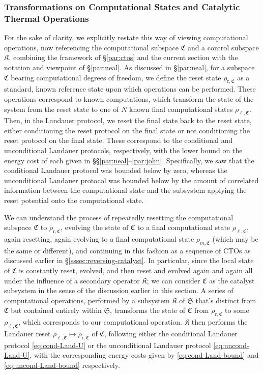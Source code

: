 \documentclass[preprints,article,accept,moreauthors,pdftex]{Definitions/mdpi}
\begin{document}
\begin{paracol}{2}
\subsubsection{Transformations on Computational States and Catalytic Thermal Operations}
\label{sssec:CTOs-catalysts-computers}
For the sake of clarity, we explicitly restate this way of viewing computational operations, now referencing the computational subspace $\mathfrak{C}$ and a control subspace $\mathfrak{K}$, combining the framework of \S\ref{par:ctos} and the current section with the notation and viewpoint of \S\ref{par:neal}. As discussed in \S\ref{par:neal}, for a subspace $\mathfrak{C}$ bearing computational degrees of freedom, we define the reset state $\rho_{\mathrm{r},\mathfrak{C}}$ as a standard, known reference state upon which operations can be performed. These operations correspond to known computations, which transform the state of the system from the reset state to one of $N$ known final computational states $\rho_{\ell,\mathfrak{C}}$. Then, in the Landauer protocol, we reset the final state back to the reset state, either conditioning the reset protocol on the final state or not conditioning the reset protocol on the final state. These correspond to the conditional and unconditional Landauer protocols, respectively, with the lower bound on the energy cost of each given in \S\S\ref{par:neal}--\ref{par:john}. Specifically, we saw that the conditional Landauer protocol was bounded below by zero, whereas the unconditional Landauer protocol was bounded below by the amount of correlated information between the computational state and the subsystem applying the reset potential onto the computational state.

We can understand the process of repeatedly resetting the computational subspace $\mathfrak{C}$ to $\rho_{\mathrm{r},\mathfrak{C}}$, evolving the state of $\mathfrak{C}$ to a final computational state $\rho_{\ell,\mathfrak{C}}$, again resetting, again evolving to a final computational state $\rho_{m,\mathfrak{C}}$ (which may be the same or different), and continuing in this fashion as a sequence of CTOs as discussed earlier in \S\ref{sssec:reversing-catalyst}. In particular, since the local state of $\mathfrak{C}$ is constantly reset, evolved, and then reset and evolved again and again all under the influence of a secondary operator $\mathfrak{K}$; we can consider $\mathfrak{C}$ as the catalyst subsystem in the sense of the discussion earlier in this section. A series of computational operations, performed by a subsystem $\mathfrak{K}$ of $\mathfrak{S}$ that's distinct from $\mathfrak{C}$ but contained entirely within $\mathfrak{S}$, transforms the state of $\mathfrak{C}$ from $\rho_{\mathrm{r},\mathfrak{C}}$ to some $\rho_{\ell,\mathfrak{C}}$, which corresponds to our computational operation. $\mathfrak{K}$ then performs the Landauer reset $\rho_{\ell,\mathfrak{C}} \mapsto \rho_{\mathrm{r},\mathfrak{C}}$ of $\mathfrak{C}$, following either the conditional Landauer protocol \eqref{eq:cond-Land-U} or the unconditional Landauer protocol \eqref{eq:uncond-Land-U}, with the corresponding energy costs given by \eqref{eq:cond-Land-bound} and \eqref{eq:uncond-Land-bound} respectively.


\end{paracol}
\end{document}
